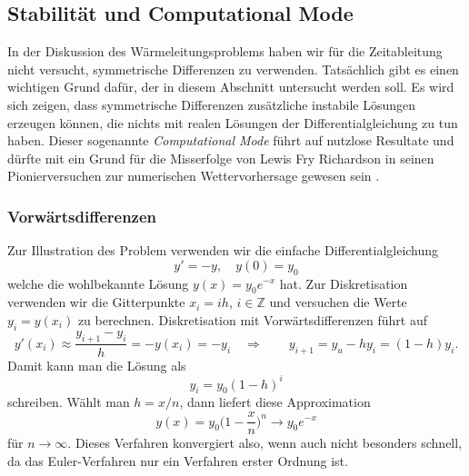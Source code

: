 %
%
%
\subsection{Stabilität und Computational Mode
\label{pde:subsection:stabilitaet}}
In der Diskussion des Wärmeleitungsproblems haben wir für die Zeitableitung
nicht versucht, symmetrische Differenzen zu verwenden.
Tatsächlich gibt es einen wichtigen Grund dafür, der in diesem Abschnitt
untersucht werden soll.
Es wird sich zeigen, dass symmetrische Differenzen zusätzliche instabile
Lösungen erzeugen können, die nichts mit realen Lösungen der
Differentialgleichung zu tun haben.
%
%
Dieser sogenannte {\em Computational Mode}
%
führt auf nutzlose Resultate und dürfte mit ein Grund für die Misserfolge
von Lewis Fry Richardson in seinen Pionierversuchen zur numerischen
Wettervorhersage gewesen sein
\cite{buch:richardson}.
%
%

\subsubsection{Vorwärtsdifferenzen}
Zur Illustration des Problem verwenden wir die einfache Differentialgleichung
\[
y' = -y,\quad y(0)=y_0
\]
welche die wohlbekannte Lösung $y(x)=y_0e^{-x}$ hat.
Zur Diskretisation verwenden wir die Gitterpunkte $x_i=ih$, $i\in\mathbb Z$
und versuchen die Werte $y_i = y(x_i)$ zu berechnen.
Diskretisation mit Vorwärtsdifferenzen führt auf 
\[
y'(x_i) \approx \frac{y_{i+1}-y_i}{h} = -y(x_i) = -y_i
\quad\Rightarrow\qquad
y_{i+1} = y_u-hy_i = (1-h)y_i.
\]
Damit kann man die Lösung als 
\[
y_i = y_0(1-h)^i
\]
schreiben.
Wählt man $h=x/n$, dann liefert diese Approximation
\[
y(x) = y_0\biggl(1-\frac{x}n\biggr)^n 
\to
y_0e^{-x}
\]
für $n\to\infty$.
Dieses Verfahren konvergiert also, wenn auch nicht besonders schnell,
da das Euler-Verfahren nur ein Verfahren erster Ordnung ist.
%

